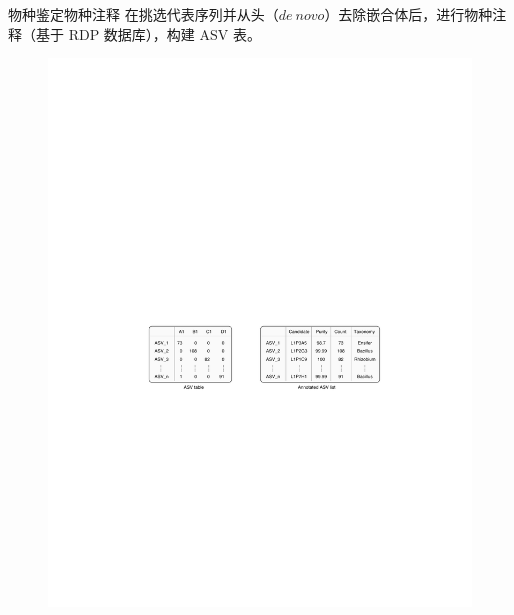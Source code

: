 \documentclass[UTF8]{ctexbeamer}
\begin{document}
	\begin{frame}{物种鉴定}{物种注释}
		\qquad 在挑选代表序列并从头（$de~novo$）去除嵌合体后，进行物种注释（基于 RDP 数据库），构建 ASV 表。

		\begin{figure}
			\centering
			\includegraphics[width=\textwidth]{img/ASVtable.pdf}
		\end{figure}

	\end{frame}

\end{document}
